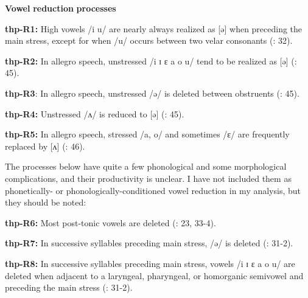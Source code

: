 \begin{styleBody}
\textbf{Vowel} \textbf{reduction} \textbf{processes}
\end{styleBody}

\begin{styleBody}
\textbf{thp-R1:} High vowels /i u/ are nearly always realized as [ə] when preceding the main stress, except for when /u/ occurs between two velar consonants (\citealt{ThompsonThompson1992}: 32).
\end{styleBody}

\begin{styleBody}
\textbf{thp-R2:} In allegro speech, unstressed /i ɪ ɛ a o u/ tend to be realized as [ə] (\citealt{ThompsonThompson1992}: 45).
\end{styleBody}

\begin{styleBody}
\textbf{thp-R3}: In allegro speech, unstressed /ə/ is deleted between obstruents (\citealt{ThompsonThompson1992}: 45).
\end{styleBody}

\begin{styleBody}
\textbf{thp-R4:} Unstressed /ʌ/ is reduced to [ə] (\citealt{ThompsonThompson1992}: 45).
\end{styleBody}

\begin{styleBody}
\textbf{thp-R5:} In allegro speech, stressed /a, o/ and sometimes /ɛ/ are frequently replaced by [ʌ] (\citealt{ThompsonThompson1992}: 46).
\end{styleBody}

\begin{styleBody}
The processes below have quite a few phonological and some morphological complications, and their productivity is unclear. I have not included them as phonetically- or phonologically-conditioned vowel reduction in my analysis, but they should be noted:
\end{styleBody}

\begin{styleBody}
\textbf{thp-R6:} Most post-tonic vowels are deleted (\citealt{ThompsonThompson1992}: 23, 33-4).
\end{styleBody}

\begin{styleBody}
\textbf{thp-R7:} In successive syllables preceding main stress, /ə/ is deleted (\citealt{ThompsonThompson1992}: 31-2).
\end{styleBody}

\begin{styleBody}
\textbf{thp-R8:} In successive syllables preceding main stress, vowels /i ɪ ɛ a o u/ are deleted when adjacent to a laryngeal, pharyngeal, or homorganic semivowel and preceding the main stress (\citealt{ThompsonThompson1992}: 31-2).
\end{styleBody}

